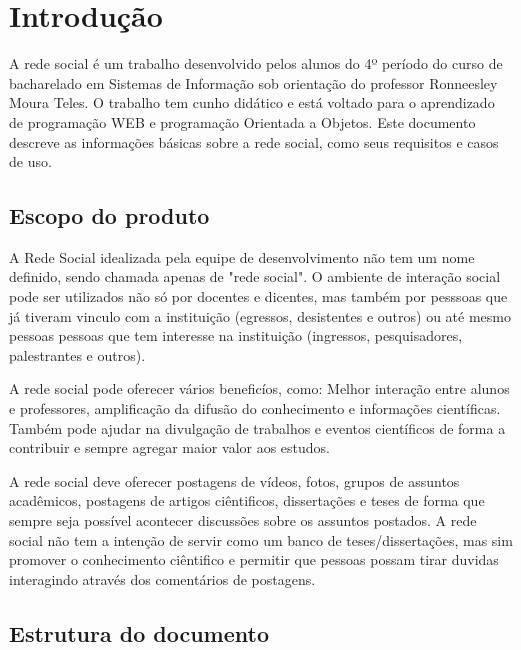 \chapter{Introdução}

A rede social é um trabalho desenvolvido pelos alunos do 4º período do curso de bacharelado em Sistemas de Informação sob orientação do professor Ronneesley Moura Teles.
O trabalho tem cunho didático e está voltado para o aprendizado de programação WEB e programação Orientada a Objetos.
Este documento descreve as informações básicas sobre a rede social, como seus requisitos e casos de uso.


\section{Escopo do produto}
A Rede Social idealizada pela equipe de desenvolvimento não tem um nome definido, sendo chamada apenas de "rede social".
O ambiente de interação social pode ser utilizados não só por docentes e dicentes, mas também por pesssoas que já tiveram vinculo com a instituição (egressos, desistentes e outros) ou até mesmo
pessoas pessoas que tem interesse na instituição (ingressos, pesquisadores, palestrantes e outros).

A rede social pode oferecer vários beneficíos, como: Melhor interação entre alunos e professores, amplificação da difusão do conhecimento e informações científicas.
Também pode ajudar na divulgação de trabalhos e eventos científicos de forma a contribuir e sempre agregar maior valor aos estudos.

A rede social deve oferecer postagens de vídeos, fotos, grupos de assuntos acadêmicos, postagens de artigos ciêntificos, dissertações e teses de forma que sempre seja possível 
acontecer discussões sobre os assuntos postados. A rede social não tem a intenção de servir como um banco de teses/dissertações, mas sim promover o conhecimento ciêntifico e permitir
que pessoas possam tirar duvidas interagindo através dos comentários de postagens. 
  

\section{Estrutura do documento}


